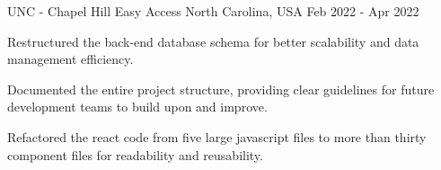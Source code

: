\begin{cventries}

  \cventry
    {UNC - Chapel Hill} %
    {Easy Access} %
    {North Carolina, USA} %
    {Feb 2022 - Apr 2022} %
    {
      \begin{cvitems} %
        \item {Restructured the back-end database schema for better scalability and data management efficiency.}
        \item {Documented the entire project structure, providing clear guidelines for future development teams to build upon and improve.}
        \item {Refactored the react code from five large javascript files to more than thirty component files for readability and reusability.}
      \end{cvitems}
    }

\end{cventries}
